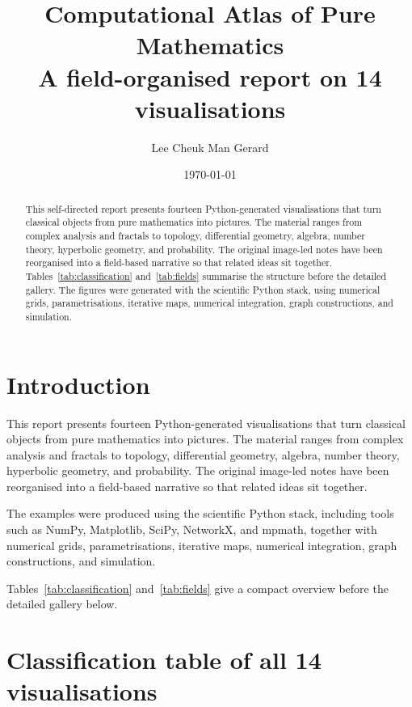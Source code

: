 \documentclass[11pt,a4paper]{article}
\title{\textbf{Computational Atlas of Pure Mathematics}\\[0.4em]
\large A field-organised report on 14 visualisations}
\author{Lee Cheuk Man Gerard}
\date{\today}
\begin{document}
\maketitle

\begin{abstract}
This self-directed report presents fourteen Python-generated visualisations that turn classical objects from pure mathematics into pictures. The material ranges from complex analysis and fractals to topology, differential geometry, algebra, number theory, hyperbolic geometry, and probability. The original image-led notes have been reorganised into a field-based narrative so that related ideas sit together. Tables~\ref{tab:classification} and~\ref{tab:fields} summarise the structure before the detailed gallery. The figures were generated with the scientific Python stack, using numerical grids, parametrisations, iterative maps, numerical integration, graph constructions, and simulation.
\end{abstract}

\tableofcontents
\newpage

\section{Introduction}

This report presents fourteen Python-generated visualisations that turn classical objects from pure mathematics into pictures. The material ranges from complex analysis and fractals to topology, differential geometry, algebra, number theory, hyperbolic geometry, and probability. The original image-led notes have been reorganised into a field-based narrative so that related ideas sit together.

The examples were produced using the scientific Python stack, including tools such as NumPy, Matplotlib, SciPy, NetworkX, and mpmath, together with numerical grids, parametrisations, iterative maps, numerical integration, graph constructions, and simulation.

Tables~\ref{tab:classification} and~\ref{tab:fields} give a compact overview before the detailed gallery below.

\clearpage
{}
\section{Classification table of all 14 visualisations}
\end{document}
